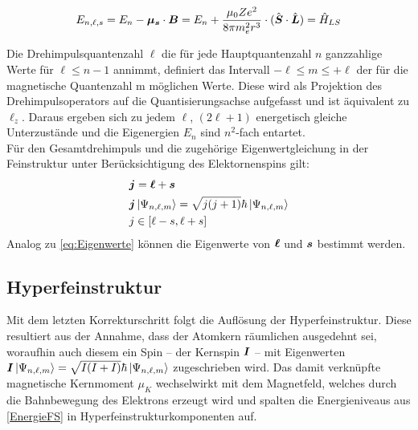 \begin{align}
    E_{n,\ell,s} = E_{n}-\boldsymbol{\mu_{s}} \cdot \boldsymbol{B} = E_{n} + \frac{\mu_{0}Ze^2}{8\pi m_{e}^2r^{3}}\cdot (\hat{\boldsymbol{S}} \cdot \hat{\boldsymbol{L}}) = \hat{H}_{LS} \label{EnergieFS}
\end{align}

\noindent Die Drehimpulsquantenzahl $\ell$ die für jede Hauptquantenzahl $n$ ganzzahlige Werte für $\ell \leq n- 1 $ annimmt, definiert das Intervall $-\ell \leq m \leq + \ell$ der für die magnetische Quantenzahl m möglichen Werte. Diese wird als Projektion des Drehimpulsoperators auf die Quantisierungsachse aufgefasst und ist äquivalent zu $\ell_{z}$. Daraus ergeben sich zu jedem $\ell$, $(2\ell +1)$ energetisch gleiche Unterzustände und die Eigenergien $E_{n}$ sind $n^2$-fach entartet. \cite{Bloch}\\

\noindent Für den Gesamtdrehimpuls und die zugehörige Eigenwertgleichung in der Feinstruktur unter Berücksichtigung des Elektornenspins gilt:
\begin{align}
    &\boldsymbol{j}=\boldsymbol{\ell} + \boldsymbol{s}\\
    &\boldsymbol{j}\ket{\Psi_{n, \ell, m}}=\sqrt{j(j+1)}\hbar\ket{\Psi_{n,\ell,m}}\label{eq:Eigenwerte}\\ 
    &j \in [\ell - s, \ell + s]
\end{align}
\noindent Analog zu \eqref{eq:Eigenwerte} können die Eigenwerte von $\boldsymbol{\ell}$ und $\boldsymbol{s}$ bestimmt werden.


\subsection{Hyperfeinstruktur}

\noindent Mit dem letzten Korrekturschritt folgt die Auflösung der Hyperfeinstruktur. Diese resultiert aus der Annahme, dass der Atomkern räumlichen ausgedehnt sei, woraufhin auch diesem ein Spin -- der Kernspin $\boldsymbol{I}$ -- mit Eigenwerten $\boldsymbol{I}\ket{\Psi_{n, \ell, m}}=\sqrt{I(I+I)}\hbar\ket{\Psi_{n,\ell,m}}$ zugeschrieben wird. Das damit verknüpfte magnetische Kernmoment $\mu_{K}$ wechselwirkt mit dem Magnetfeld, welches durch die Bahnbewegung des Elektrons erzeugt wird und spalten  die Energieniveaus aus \eqref{EnergieFS} in Hyperfeinstrukturkomponenten auf.


